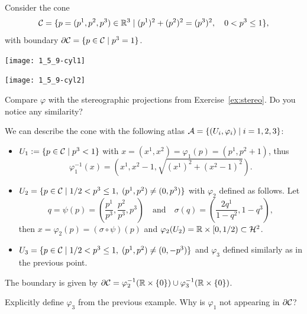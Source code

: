 \begin{example}
  Consider the cone
  \begin{equation}
    \mathcal{C} = \{p=(p^1,p^2,p^3)\in\mathbb{R}^3 \mid (p^1)^2 + (p^2)^2 = (p^3)^2, \quad 0< p^3\leq 1\},
  \end{equation}
  with boundary $\partial\mathcal{C} = \{p\in\mathcal{C} \mid p^3 = 1\}$.
  \begin{marginfigure}[-3cm]
    \texttt{[image: 1\_5\_9-cyl1]}
  \end{marginfigure}
  \begin{marginfigure}
    \texttt{[image: 1\_5\_9-cyl2]}
    \caption{Compare $\varphi$ with the stereographic projections from Exercise~\ref{ex:stereo}. Do you notice any similarity?}
\end{marginfigure}
  We can describe the cone with the following atlas $\mathcal{A} = \{(U_i,\varphi_i)\mid i=1,2,3\}$:
  \begin{itemize}
    \item $U_1 := \{p\in\mathcal{C}\mid p^3 < 1\}$ with $x = (x^1, x^2) = \varphi_1(p) = (p^1,p^2+1)$, thus
          \begin{equation}
            \varphi_1^{-1}(x) = \left(x^1, x^2-1, \sqrt{(x^1)^2 + (x^2-1)^2}\right).
          \end{equation}
    \item $U_2 = \{p\in\mathcal{C}\mid 1/2 < p^3 \leq 1, \; (p^1, p^2) \neq (0, p^3)\}$ with $\varphi_2$ defined as follows. Let
          \begin{equation}
            q = \psi(p) = \left(\frac{p^1}{p^3}, \frac{p^2}{p^3}, p^3\right)
            \quad\mbox{and}\quad
            \sigma(q) = \left(\frac{2q^1}{1-q^2}, 1-q^3\right),
          \end{equation}
          then $x = \varphi_2(p) = (\sigma\circ\psi)(p)$ and $\varphi_2(U_2) = \mathbb{R}\times[0,1/2) \subset\mathcal{H}^2$.
    \item $U_3 = \{p\in\mathcal{C}\mid 1/2 < p^3 \leq 1, \; (p^1, p^2) \neq (0, -p^3) \}$ and $\varphi_3$ defined similarly as in the previous point.
  \end{itemize}
    The boundary is given by $\partial\mathcal{C} = \varphi_2^{-1}(\mathbb{R}\times\{0\}) \cup \varphi_3^{-1}(\mathbb{R}\times\{0\})$.
\end{example}

\begin{exercise}
  Explicitly define $\varphi_3$ from the previous example.
  Why is $\varphi_1$ not appearing in $\partial \mathcal{C}$?
\end{exercise}

